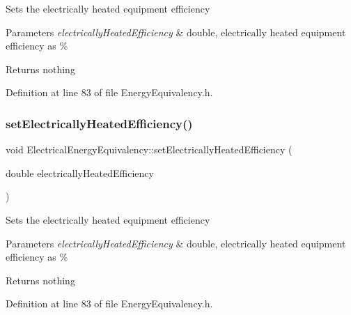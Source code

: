 Sets the electrically heated equipment efficiency


\begin{DoxyParams}{Parameters}
{\em electrically\+Heated\+Efficiency} & double, electrically heated equipment efficiency as \%\\
\hline
\end{DoxyParams}
\begin{DoxyReturn}{Returns}
nothing 
\end{DoxyReturn}


Definition at line 83 of file Energy\+Equivalency.\+h.

\mbox{\label{class_electrical_energy_equivalency_ab9091e720096a4c088cece14e975ccb4}} 
\subsubsection{\texorpdfstring{set\+Electrically\+Heated\+Efficiency()}{setElectricallyHeatedEfficiency()}\hspace{0.1cm}{\footnotesize\ttfamily [2/3]}}
{\footnotesize\ttfamily void Electrical\+Energy\+Equivalency\+::set\+Electrically\+Heated\+Efficiency (\begin{DoxyParamCaption}\item[{double}]{electrically\+Heated\+Efficiency }\end{DoxyParamCaption})\hspace{0.3cm}{\ttfamily [inline]}}

Sets the electrically heated equipment efficiency


\begin{DoxyParams}{Parameters}
{\em electrically\+Heated\+Efficiency} & double, electrically heated equipment efficiency as \%\\
\hline
\end{DoxyParams}
\begin{DoxyReturn}{Returns}
nothing 
\end{DoxyReturn}


Definition at line 83 of file Energy\+Equivalency.\+h.

\mbox{\label{class_electrical_energy_equivalency_ab9091e720096a4c088cece14e975ccb4}} 
